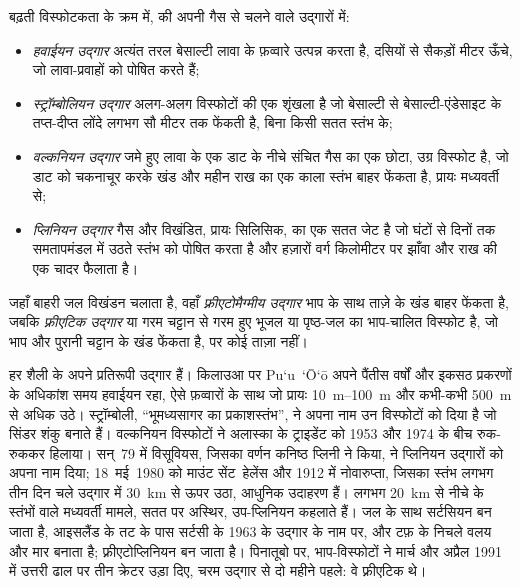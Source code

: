 \begin{definition}[उद्गार-शैलियाँ]\label{def:b2:eruptive-styles:styles}
बढ़ती विस्फोटकता के क्रम में,  की अपनी गैस से चलने वाले उद्गारों में:
\begin{itemize}
\item \emph{हवाईयन उद्गार} अत्यंत तरल बेसाल्टी लावा के
फ़व्वारे उत्पन्न करता है, दसियों से सैकड़ों मीटर ऊँचे, जो लावा-प्रवाहों को पोषित करते हैं;
\item \emph{स्ट्रॉम्बोलियन उद्गार} अलग-अलग
विस्फोटों की एक शृंखला है जो बेसाल्टी से
बेसाल्टी-एंडेसाइट  के तप्त-दीप्त लोंदे लगभग सौ मीटर तक फेंकती है, बिना किसी सतत
स्तंभ के;
\item \emph{वल्कनियन उद्गार} जमे हुए लावा के एक डाट के नीचे
संचित गैस का एक छोटा, उग्र विस्फोट है, जो
डाट को चकनाचूर करके खंड और महीन राख का एक काला स्तंभ बाहर फेंकता है, प्रायः
मध्यवर्ती  से;
\item \emph{प्लिनियन उद्गार} गैस और विखंडित, प्रायः
सिलिसिक,  का एक सतत जेट है जो घंटों से दिनों तक समतापमंडल में
उठते स्तंभ को पोषित करता है और हज़ारों वर्ग किलोमीटर पर झाँवा और राख की
एक चादर फैलाता है।
\end{itemize}
जहाँ बाहरी जल विखंडन चलाता है, वहाँ \emph{फ़्रीएटोमैग्मीय
उद्गार} भाप के साथ ताज़े  के खंड
बाहर फेंकता है, जबकि \emph{फ़्रीएटिक उद्गार}
 या गरम चट्टान से गरम हुए भूजल या पृष्ठ-जल का भाप-चालित विस्फोट है,
जो भाप और पुरानी चट्टान के खंड फेंकता है, पर कोई ताज़ा  नहीं।
\end{definition}

हर शैली के अपने प्रतिरूपी उद्गार हैं। किलाउआ पर Pu`u~`\=O`\=o अपने
पैंतीस वर्षों और इकसठ प्रकरणों के अधिकांश समय हवाईयन रहा, ऐसे फ़व्वारों के साथ जो प्रायः
\qtyrange{10}{100}{m} और कभी-कभी \qty{500}{m} से अधिक उठे। स्ट्रॉम्बोली,
``भूमध्यसागर का प्रकाशस्तंभ'', ने अपना नाम उन विस्फोटों को दिया है जो
सिंडर शंकु बनाते हैं। वल्कनियन विस्फोटों ने अलास्का के ट्राइडेंट को
1953 और 1974 के बीच रुक-रुककर हिलाया। सन्~79 में विसूवियस, जिसका वर्णन कनिष्ठ प्लिनी ने किया, ने
प्लिनियन उद्गारों को अपना नाम दिया; 18~मई~1980 को माउंट सेंट~हेलेंस और 1912 में नोवारुप्ता,
जिसका स्तंभ लगभग तीन दिन चले उद्गार में \qty{30}{km} से ऊपर उठा,
आधुनिक उदाहरण हैं।
लगभग \qty{20}{km} से नीचे के स्तंभों वाले मध्यवर्ती मामले, सतत पर अस्थिर,
उप-प्लिनियन कहलाते हैं। जल के साथ  सर्टसियन बन जाता है,
आइसलैंड के तट के पास सर्टसी के 1963 के उद्गार के नाम पर, और टफ़ के
निचले वलय और मार बनाता है;  फ़्रीएटोप्लिनियन बन जाता है। पिनातूबो पर,
भाप-विस्फोटों ने मार्च और अप्रैल 1991 में उत्तरी ढाल पर तीन क्रेटर उड़ा दिए, चरम उद्गार से
दो महीने पहले: वे फ़्रीएटिक थे।

